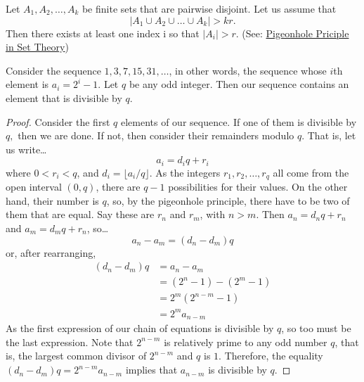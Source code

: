 \begin{theorem}
Let $A_1, A_2, \dots, A_k$ be finite sets that are pairwise disjoint. Let us assume that
$$|A_1 \cup A_2 \cup \dots \cup A_k| > kr.$$
Then there exists at least one index i so that $|A_i| > r$. (See: \hyperref[pigeonholeprinciple]{Pigeonhole Priciple in Set Theory})
\end{theorem}

\begin{example}
Consider the sequence $1,3,7,15,31,\dots$, in other words, the sequence whose $i$th element is $a_i = 2^i-1.$ Let $q$ be any odd integer.
Then our sequence contains an element that is divisible by $q$.
\end{example}

\begin{proof}
Consider the first $q$ elements of our sequence. If one of them is divisible by $q,$ then we are done. If not, then consider their remainders modulo $q$. That is, let us write\dots
$$a_i = d_i q + r_i$$
where $0 < r_i < q$, and $d_i = \lfloor a_i / q \rfloor $. As the integers $r_1,r_2,\dots,r_q$ all come from the open interval $(0,q)$, there are $q-1$ possibilities for their values. 
On the other hand, their number is $q$, so, by the pigeonhole principle, there have to be two of them that are equal. Say these are $r_n$ and $r_m$, with $n > m$. Then $a_n = d_n q + r_n$
and $a_m = d_m q + r_n$, so\dots
$$a_n - a_m = (d_n - d_m)q$$
or, after rearranging,
\begin{align*}
  (d_n - d_m)q &= a_n - a_m \\
  			   &= (2^n - 1) - (2^m - 1) \\
 			   &= 2^m(2^{n-m} - 1)\\
 			   &= 2^m a_{n-m}
\end{align*}
As the first expression of our chain of equations is divisible by $q$, so too must be the last expression. Note that $2^{n-m}$ is relatively prime to any odd number $q$, that is, the largest
common divisor of $2^{n-m}$ and $q$ is $1$. Therefore, the equality $(d_n - d_m)q = 2^{n-m}a_{n-m}$ implies that $a_{n-m}$ is divisible by $q.$
\end{proof}